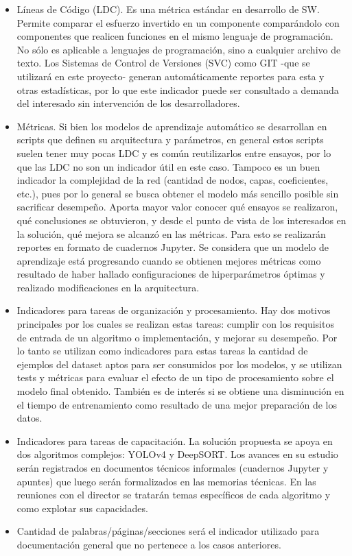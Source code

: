 \documentclass[11pt]{charter}
\begin{document}
\begin{itemize}
	\item Líneas de Código (LDC). Es una métrica estándar en desarrollo de SW. Permite comparar el esfuerzo invertido en un componente comparándolo con componentes que realicen funciones en el mismo lenguaje de programación. No sólo es aplicable a lenguajes de programación, sino a cualquier archivo de texto. Los Sistemas de Control de Versiones (SVC) como GIT -que se utilizará en este proyecto- generan automáticamente reportes para esta y otras estadísticas, por lo que este indicador puede ser consultado a demanda del interesado sin intervención de los desarrolladores.
	\item Métricas. Si bien los modelos de aprendizaje automático se desarrollan en scripts que definen su arquitectura y parámetros, en general estos scripts suelen tener muy pocas LDC y es común reutilizarlos entre ensayos, por lo que las LDC no son un indicador útil en este caso. Tampoco es un buen indicador la complejidad de la red (cantidad de nodos, capas, coeficientes, etc.), pues por lo general se busca obtener el modelo más sencillo posible sin sacrificar desempeño. Aporta mayor valor conocer qué ensayos se realizaron, qué conclusiones se obtuvieron, y desde el punto de vista de los interesados en la solución, qué mejora se alcanzó en las métricas. Para esto se realizarán reportes en formato de cuadernos Jupyter. Se considera que un modelo de aprendizaje está progresando cuando se obtienen mejores métricas como resultado de haber hallado configuraciones de hiperparámetros óptimas y realizado modificaciones en la arquitectura. 
	\item Indicadores para tareas de organización y procesamiento. Hay dos motivos principales por los cuales se realizan estas tareas: cumplir con los requisitos de entrada de un algoritmo o implementación, y mejorar su desempeño. Por lo tanto se utilizan como indicadores para estas tareas la cantidad de ejemplos del dataset aptos para ser consumidos por los modelos, y se utilizan tests y métricas para evaluar el efecto de un tipo de procesamiento sobre el modelo final obtenido. También es de interés si se obtiene una disminución en el tiempo de entrenamiento como resultado de una mejor preparación de los datos.
	\item Indicadores para tareas de capacitación. La solución propuesta se apoya en dos algoritmos complejos: YOLOv4 y DeepSORT. Los avances en su estudio serán registrados en documentos técnicos informales (cuadernos Jupyter y apuntes) que luego serán formalizados en las memorias técnicas. En las reuniones con el director se tratarán temas específicos de cada algoritmo y como explotar sus capacidades.
	\item Cantidad de palabras/páginas/secciones será el indicador utilizado para documentación general que no pertenece a los casos anteriores.		
\end{itemize}
\end{document}
